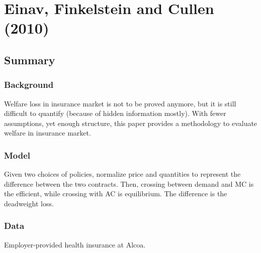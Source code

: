 \section{Einav, Finkelstein and Cullen (2010)}

\subsection{Summary}

\subsubsection{Background}

Welfare loss in insurance market is not to be proved anymore, but it is still difficult to quantify (because of hidden information mostly). With fewer assumptions, yet enough structure, this paper provides a methodology to evaluate welfare in insurance market.

\subsubsection{Model}

Given two choices of policies, normalize price and quantities to represent the difference between the two contracts. Then, crossing between demand and MC is the efficient, while crossing with AC is equilibrium. The difference is the deadweight loss.

\subsubsection{Data}

Employer-provided health insurance at Alcoa.